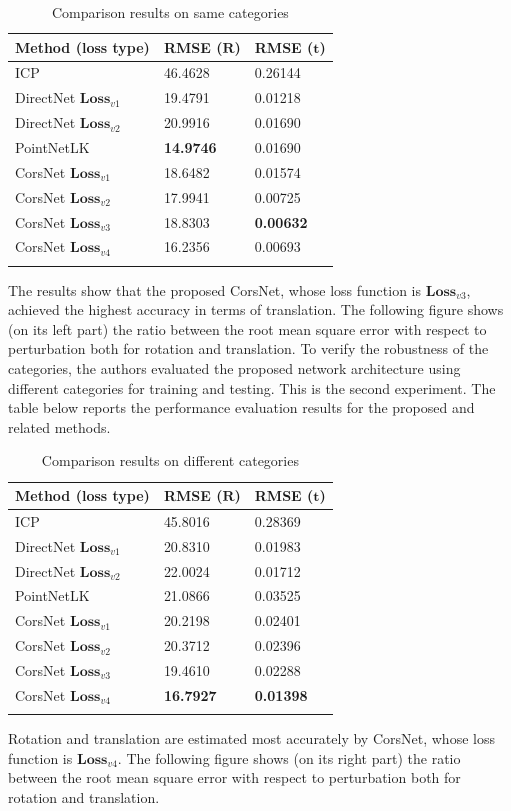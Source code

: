 \begin{longtable}[]{@{}lll@{}}
\toprule
\textbf{Method (loss type)} & \textbf{RMSE ($\boldsymbol{R}$)} &
\textbf{RMSE ($\boldsymbol{t}$)}\tabularnewline
\midrule
\endhead
ICP & 46.4628 & 0.26144\tabularnewline
DirectNet $\boldsymbol{Loss}_{v1}$ & 19.4791 & 0.01218\tabularnewline
DirectNet $\boldsymbol{Loss}_{v2}$ & 20.9916 & 0.01690\tabularnewline
PointNetLK & \textbf{14.9746} & 0.01690\tabularnewline
CorsNet $\boldsymbol{Loss}_{v1}$ & 18.6482 & 0.01574\tabularnewline
CorsNet $\boldsymbol{Loss}_{v2}$ & 17.9941 & 0.00725\tabularnewline
CorsNet $\boldsymbol{Loss}_{v3}$ & 18.8303 &
\textbf{0.00632}\tabularnewline
CorsNet $\boldsymbol{Loss}_{v4}$ & 16.2356 & 0.00693\tabularnewline
\bottomrule
\caption{Comparison results on same categories}
\end{longtable}

The results show that the proposed CorsNet, whose loss function is
$\boldsymbol{Loss}_{v3}$, achieved the highest accuracy in terms of
translation. The following figure shows (on its left part) the ratio
between the root mean square error with respect to perturbation both for
rotation and translation. To verify the robustness of the categories,
the authors evaluated the proposed network architecture using different
categories for training and testing. This is the second experiment. The
table below reports the performance evaluation results for the proposed
and related methods.

\begin{longtable}[]{@{}lll@{}}
\toprule
\textbf{Method (loss type)} & \textbf{RMSE ($\boldsymbol{R}$)} &
\textbf{RMSE ($\boldsymbol{t}$)}\tabularnewline
\midrule
\endhead
ICP & 45.8016 & 0.28369\tabularnewline
DirectNet $\boldsymbol{Loss}_{v1}$ & 20.8310 & 0.01983\tabularnewline
DirectNet $\boldsymbol{Loss}_{v2}$ & 22.0024 & 0.01712\tabularnewline
PointNetLK & 21.0866 & 0.03525\tabularnewline
CorsNet $\boldsymbol{Loss}_{v1}$ & 20.2198 & 0.02401\tabularnewline
CorsNet $\boldsymbol{Loss}_{v2}$ & 20.3712 & 0.02396\tabularnewline
CorsNet $\boldsymbol{Loss}_{v3}$ & 19.4610 & 0.02288\tabularnewline
CorsNet $\boldsymbol{Loss}_{v4}$ & \textbf{16.7927} &
\textbf{0.01398}\tabularnewline
\bottomrule
\caption{Comparison results on different categories}
\end{longtable}

Rotation and translation are estimated most accurately by CorsNet, whose
loss function is $\boldsymbol{Loss}_{v4}$. The following figure shows
(on its right part) the ratio between the root mean square error with
respect to perturbation both for rotation and translation.

